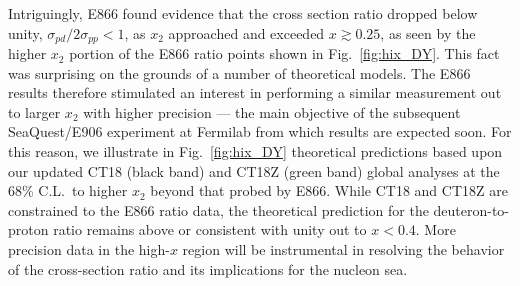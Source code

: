 Intriguingly, E866 \cite{Towell:2001nh} found evidence that the cross section ratio dropped below unity, $\sigma_{pd} \big/ 2\sigma_{pp} < 1$,
as $x_2$ approached and exceeded $x \gtrsim 0.25$, as seen by the higher $x_2$ portion of the E866 ratio points shown
in Fig.~\ref{fig:hix_DY}. This fact was surprising on the grounds of a number of theoretical models.
%
%
The E866 results therefore stimulated an interest in performing a similar measurement out to larger $x_2$ with higher
precision --- the main objective of the subsequent SeaQuest/E906 experiment at Fermilab \cite{Aidala:2017ofy} from which
results are expected soon. For this reason, we illustrate in Fig.~\ref{fig:hix_DY} theoretical predictions based upon our
updated CT18 (black band) and CT18Z (green band) global analyses at the 68\% C.L.~to higher $x_2$ beyond that probed by E866.  While CT18
and CT18Z are constrained to the E866 ratio data, the theoretical prediction for
the deuteron-to-proton ratio remains above or consistent with unity out to
$x\! <\! 0.4$.  More precision data in the high-$x$ region will be instrumental in
resolving the behavior of the cross-section ratio and its implications for the
nucleon sea.
 
\clearpage
